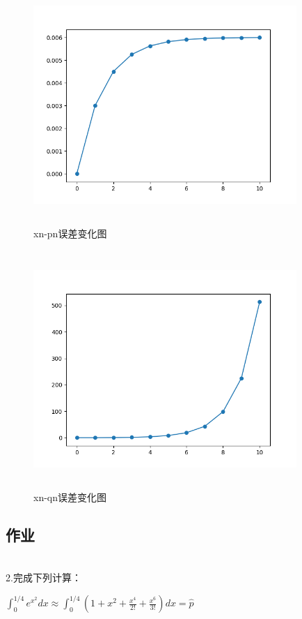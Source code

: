 \documentclass[UTF8]{ctexart}
\begin{document}
\begin{figure}[H]
 \centering
  \includegraphics[width=10cm,height=9cm]{1-2-2.png}
  \caption{xn-pn误差变化图}
\end{figure}



\begin{figure}[H]
 \centering
  \includegraphics[width=10cm,height=9cm]{1-2-3.png}
  \caption{xn-qn误差变化图}
\end{figure}




\newpage
\subsection{作业}
~\\
2.完成下列计算：

$ \int_{0}^{1 / 4} e^{x^{2}} d x  \approx \int_{0}^{1 / 4}\left(1+x^{2}+\frac{x^{4}}{2 !}+\frac{x^{6}}{3 !}\right) d x = \hat{p}$
\end{document}
